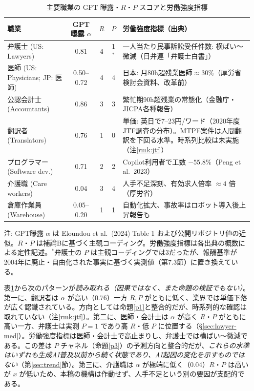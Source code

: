 \documentclass[11pt]{article}
\theoremstyle{plain}
\theoremstyle{definition}
\theoremstyle{remark}
\begin{document}
\begin{table}[h]\centering\small
\caption{主要職業の GPT 曝露・$R$・$P$ スコアと労働強度指標}\label{tab:cross}
\begin{tabularx}{\textwidth}{@{}lcccX@{}}
\toprule
職業 & GPT曝露 $\alpha$ & $R$ & $P$ & 労働強度指標（出典） \\ \midrule
弁護士 (US: Lawyers) & 0.81 & 4 & 1$^{*}$ & 一人当たり民事訴訟受任件数: 横ばい〜微減（日弁連「弁護士白書」） \\
医師 (US: Physicians; JP: 医師) & 0.50--0.72 & 4 & 4 & 日本: 月80h超残業医師$\approx$30\%（厚労省検討会資料、改革前） \\
公認会計士 (Accountants) & 0.86 & 3 & 3 & 繁忙期90h超残業の常態化（金融庁・JICPA各種報告） \\
翻訳者 (Translators) & 0.76 & 1 & 0 & 単価: 英日で7--23円/ワード（2020年度JTF調査の分布）。MTPE案件は人間翻訳を下回る水準。時系列比較は未実施（注\ref{rmk:jtf}） \\
プログラマー (Software dev.) & 0.71 & 2 & 2 & Copilot利用者で工数 $-55.8\%$（Peng et al.\ 2023） \\
介護職 (Care workers) & 0.04 & 3 & 4 & 人手不足深刻、有効求人倍率 $\approx4$ 倍（厚労省） \\
倉庫作業員 (Warehouse) & 0.05--0.20 & 1 & 1 & 自動化拡大、事故率はロボット導入後上昇報告も \\
\bottomrule
\end{tabularx}
\end{table}

\noindent 注: GPT曝露 $\alpha$ は Eloundou et al.\ (2024) Table 1 および公開リポジトリ値の近似。$R$・$P$ は補論Bに基づく主観コーディング。労働強度指標は各出典の概数による定性記述。$^{*}$弁護士の $P$ は主観コーディングでは3だったが、報酬基準が2004年に廃止・自由化された事実に基づく実測値（第7.3節）に置き換えている。

\smallskip
表\ref{tab:cross}から次のパターンが\emph{読み取れる（因果ではなく、また命題の検証でもない）}。第一に、翻訳者は $\alpha$ が高い（0.76）一方 $R,P$ がともに低く、業界では単価下落が広く認識されている。方向としては命題\ref{p1}と整合的だが、時系列的な確認は取れていない（注\ref{rmk:jtf}）。第二に、医師・会計士は $\alpha$ が高く $R$・$P$ がともに高い一方、弁護士は実測 $P=1$ であり高 $R$・低 $P$ に位置する（\S\ref{sec:lawyer-med}）。労働強度指標は医師・会計士で高止まりし、弁護士では横ばい〜微減である。この差は $P$ チャネル（命題\ref{p3}）の予測方向と整合的だが、\emph{これらの水準はいずれも生成AI普及以前から続く状態であり、AI起因の変化を示すものではない}（第\ref{sec:trend}節）。第三に、介護職は $\alpha$ が極端に低く（0.04）$R$・$P$ は高いが $x$ が低いため、本稿の機構は作動せず、人手不足という別の要因が支配的である。
\end{document}
